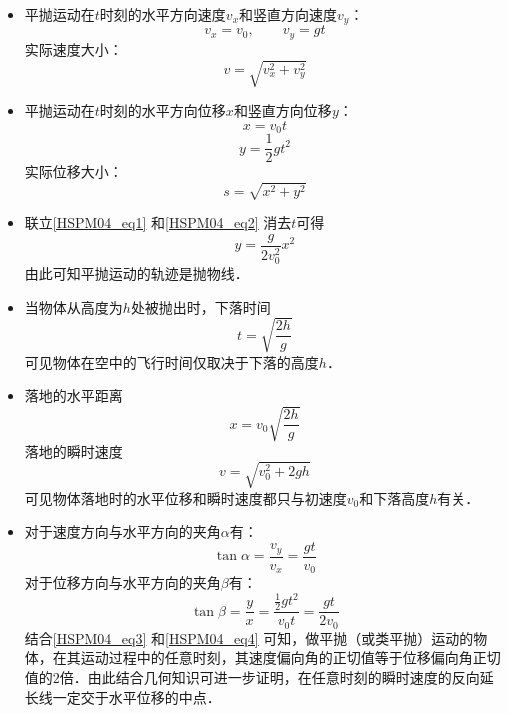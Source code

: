 \begin{itemize}
\item 平抛运动在$t$时刻的水平方向速度$v_x$和竖直方向速度$v_y$：
\begin{equation}
v_x=v_0,\qquad 
v_y=gt
\end{equation}
实际速度大小：
\begin{equation}
v=\sqrt{v_x^2+v_y^2}
\end{equation}

\item 平抛运动在$t$时刻的水平方向位移$x$和竖直方向位移$y$：
\begin{equation}\label{HSPM04_eq1}
x=v_0t
\end{equation}
\begin{equation}\label{HSPM04_eq2}
y=\frac12 gt^2
\end{equation}
实际位移大小：
\begin{equation}
s=\sqrt{x^2+y^2}
\end{equation}

\item 联立\autoref{HSPM04_eq1} 和\autoref{HSPM04_eq2} 消去$t$可得
\begin{equation}
y=\frac{g}{2v_0^2}x^2
\end{equation}
由此可知平抛运动的轨迹是抛物线．

\item 当物体从高度为$h$处被抛出时，下落时间
\begin{equation}\label{HSPM04_eq5}
t=\sqrt{\frac{2h}{g}}
\end{equation}
可见物体在空中的飞行时间仅取决于下落的高度$h$．

\item 落地的水平距离
\begin{equation}
x=v_0\sqrt{\frac{2h}{g}}
\end{equation}
落地的瞬时速度
\begin{equation}
v=\sqrt{v_0^2+2gh}
\end{equation}
可见物体落地时的水平位移和瞬时速度都只与初速度$v_0$和下落高度$h$有关．

\item 对于速度方向与水平方向的夹角$\alpha$有：
\begin{equation}\label{HSPM04_eq3}
\tan \alpha = \frac {v_y}{v_x}=\frac{gt}{v_0}
\end{equation}
对于位移方向与水平方向的夹角$\beta$有：
\begin{equation}\label{HSPM04_eq4}
\tan \beta = \frac{y}{x}=\frac{\frac12 gt^2}{v_0t} = \frac{gt}{2v_0}
\end{equation}
结合\autoref{HSPM04_eq3} 和\autoref{HSPM04_eq4} 可知，做平抛（或类平抛）运动的物体，在其运动过程中的任意时刻，其速度偏向角的正切值等于位移偏向角正切值的$2$倍．由此结合几何知识可进一步证明，在任意时刻的瞬时速度的反向延长线一定交于水平位移的中点．
\end{itemize}

